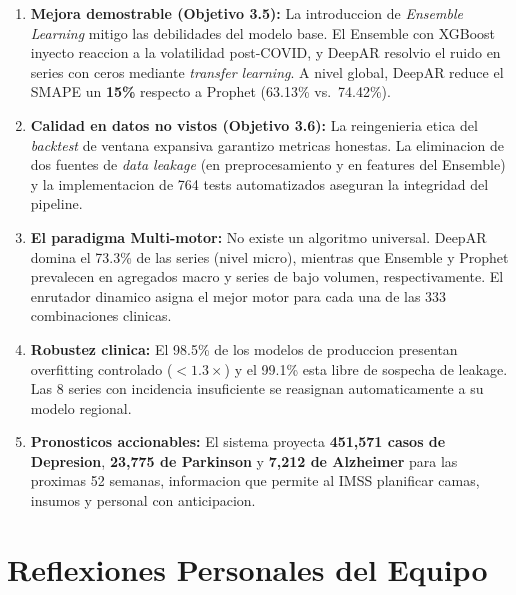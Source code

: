 \documentclass[12pt, letterpaper]{article}
\begin{document}
\begin{enumerate}
    \item \textbf{Mejora demostrable (Objetivo 3.5):} La introduccion de \textit{Ensemble Learning} mitigo las debilidades del modelo base. El Ensemble con XGBoost inyecto reaccion a la volatilidad post-COVID, y DeepAR resolvio el ruido en series con ceros mediante \textit{transfer learning}. A nivel global, DeepAR reduce el SMAPE un \textbf{15\%} respecto a Prophet (63.13\% vs.\ 74.42\%).

    \item \textbf{Calidad en datos no vistos (Objetivo 3.6):} La reingenieria etica del \textit{backtest} de ventana expansiva garantizo metricas honestas. La eliminacion de dos fuentes de \textit{data leakage} (en preprocesamiento y en features del Ensemble) y la implementacion de 764 tests automatizados aseguran la integridad del pipeline.

    \item \textbf{El paradigma Multi-motor:} No existe un algoritmo universal. DeepAR domina el 73.3\% de las series (nivel micro), mientras que Ensemble y Prophet prevalecen en agregados macro y series de bajo volumen, respectivamente. El enrutador dinamico asigna el mejor motor para cada una de las 333 combinaciones clinicas.

    \item \textbf{Robustez clinica:} El 98.5\% de los modelos de produccion presentan overfitting controlado ($<1.3\times$) y el 99.1\% esta libre de sospecha de leakage. Las 8 series con incidencia insuficiente se reasignan automaticamente a su modelo regional.

    \item \textbf{Pronosticos accionables:} El sistema proyecta \textbf{451,571 casos de Depresion}, \textbf{23,775 de Parkinson} y \textbf{7,212 de Alzheimer} para las proximas 52 semanas, informacion que permite al IMSS planificar camas, insumos y personal con anticipacion.
\end{enumerate}

\newpage

\section{Reflexiones Personales del Equipo}\label{sec:reflexiones}
\end{document}
